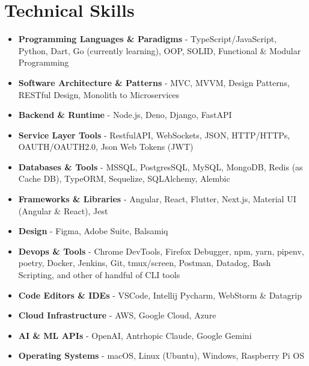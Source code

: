 \section{Technical Skills}
{
	\normalsize
	\begin{itemize}[topsep=0pt, partopsep=0pt, itemsep=0pt, parsep=0pt]
		\item \textbf{Programming Languages \& Paradigms} - TypeScript/JavaScript, Python, Dart, Go (currently learning), OOP, SOLID, Functional \& Modular Programming
		\item \textbf{Software Architecture \& Patterns} - MVC, MVVM, Design Patterns, RESTful Design, Monolith to Microservices
		\item \textbf{Backend \& Runtime} - Node.js, Deno, Django, FastAPI
		\item \textbf{Service Layer Tools} - RestfulAPI, WebSockets, JSON, HTTP/HTTPs, OAUTH/OAUTH2.0, Json Web Tokens (JWT)
		\item \textbf{Databases \& Tools} - MSSQL, PostgresSQL, MySQL, MongoDB, Redis (as Cache DB), TypeORM, Sequelize, SQLAlchemy, Alembic
		\item \textbf{Frameworks \& Libraries} - Angular, React, Flutter, Next.js, Material UI (Angular \& React), Jest
		\item \textbf{Design} - Figma, Adobe Suite, Balsamiq
		\item \textbf{Devops \& Tools} - Chrome DevTools, Firefox Debugger, npm, yarn, pipenv, poetry, Docker, Jenkins, Git, tmux/screen, Postman, Datadog, Bash Scripting, and other of handful of CLI tools
		\item \textbf{Code Editors \& IDEs} - VSCode, Intellij Pycharm, WebStorm \& Datagrip
		\item \textbf{Cloud Infrastructure} - AWS, Google Cloud, Azure
		\item \textbf{AI \& ML APIs} - OpenAI, Antrhopic Claude, Google Gemini
		\item \textbf{Operating Systems} - macOS, Linux (Ubuntu), Windows, Raspberry Pi OS
	\end{itemize}
}